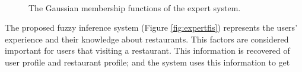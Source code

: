 \begin{figure}[ht!]
   \captionsetup{font=footnotesize}
   \centering
   \hspace{0.1\linewidth}
   \\[20pt]
    \hspace{0.1\linewidth}
   \caption{The Gaussian membership functions of the expert system.
   }
   \label{fig:mfexpert} 
\end{figure}
The proposed fuzzy inference system (Figure  \ref{fig:expertfis})
represents the users' experience and their knowledge about restaurants.
This factors are considered important for users that visiting a
restaurant. This information is recovered of user profile and
restaurant profile; and the system uses this information to get
